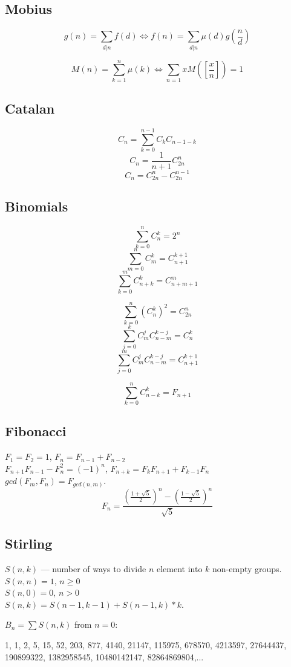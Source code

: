 \subsection{Mobius}
\[g(n) = \sum_{d|n}f(d) \iff f(n) = \sum_{d|n}\mu(d)g(\frac{n}{d})\]

\[M(n) = \sum_{k=1}^{n}\mu(k) \iff \sum_{n = 1}{x} M([\frac{x}{n}]) = 1\]

\subsection{Catalan}
$$C_n = \sum_{k = 0}^{n - 1} C_kC_{n - 1 - k}$$ 
$$C_n = \frac{1}{n + 1} C_{2n}^{n}$$
$$C_n = C_{2n}^{n} - C_{2n}^{n - 1}$$

\subsection{Binomials}
$$\sum_{k = 0}^{n} C_n^k = 2^n$$ 
$$\sum_{m = 0}^{n} C_m^k = C_{n + 1}^{k + 1}$$
$$\sum_{k = 0}^{m} C_{n + k}^k = C_{n + m + 1}^m$$

$$\sum_{k = 0}^{n} (C_n^k)^2 = C_{2n}^n$$
$$\sum_{j = 0}^{k} C_m^j C_{n-m}^{k - j} = C_n^k$$
$$\sum_{j = 0}^{m} C_m^j C_{n-m}^{k - j} = C_{n + 1}^{k + 1}$$

$$\sum_{k = 0}^{n} C_{n - k}^k = F_{n + 1}$$

\subsection{Fibonacci}
$F_1 = F_2 = 1$, $F_n = F_{n - 1} + F_{n - 2}$\\

$F_{n + 1} F_{n - 1} - F_n^2 = (-1)^n$,
$F_{n + k} = F_k F_{n + 1} + F_{k - 1} F_n$\\
$gcd(F_m, F_n) = F_{gcd(n, m)}$.
$$F_n = \frac{(\frac{1 + \sqrt{5}}{2})^n - (\frac{1 - \sqrt{5}}{2})^n}{\sqrt{5}}$$

\subsection{Stirling}

$S(n, k)$ --- number of ways to divide $n$ element into $k$ non-empty groups.\\

$S(n, n) = 1$, $n \ge 0$\\
$S(n, 0) = 0$, $n > 0$\\

$S(n, k) = S(n - 1, k - 1) + S(n - 1, k) * k$.


$B_n = \sum S(n, k)$ from $n = 0$:

1, 1, 2, 5, 15, 52, 203, 877, 4140, 21147, 115975, 678570, 4213597, 27644437, 190899322, 1382958545, 10480142147, 82864869804,...






\
